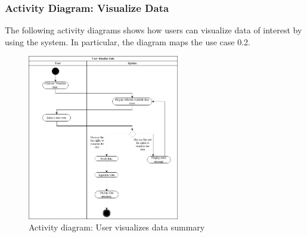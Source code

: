 \documentclass[10pt]{report}
\begin{document}
\subsubsection{Activity Diagram: Visualize Data}
The following activity diagrams shows how users can visualize data of interest by using the system. In particular, the diagram maps the use case 0.2.
\begin{figure}[H]
    \centering
    \includegraphics[width=250px]{ActivityDiagrams/VisualizeData.jpg}
    \caption{Activity diagram: User visualizes data summary}
\end{figure}
\end{document}
